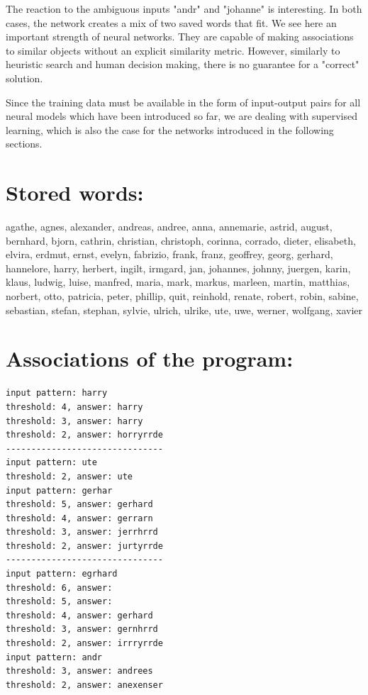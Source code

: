\documentclass[10pt]{book}
\begin{document}
\begin{center}
\begin{enumerate}
\begin{center}
\begin{center}
\begin{center}
The reaction to the ambiguous inputs "andr" and "johanne" is interesting. In both cases, the network creates a mix of two saved words that fit. We see here an important strength of neural networks. They are capable of making associations to similar objects without an explicit similarity metric. However, similarly to heuristic search and human decision making, there is no guarantee for a "correct" solution.

Since the training data must be available in the form of input-output pairs for all neural models which have been introduced so far, we are dealing with supervised learning, which is also the case for the networks introduced in the following sections.

\section*{Stored words:}
agathe, agnes, alexander, andreas, andree, anna, annemarie, astrid, august, bernhard, bjorn, cathrin, christian, christoph, corinna, corrado, dieter, elisabeth, elvira, erdmut, ernst, evelyn, fabrizio, frank, franz, geoffrey, georg, gerhard, hannelore, harry, herbert, ingilt, irmgard, jan, johannes, johnny, juergen, karin, klaus, ludwig, luise, manfred, maria, mark, markus, marleen, martin, matthias, norbert, otto, patricia, peter, phillip, quit, reinhold, renate, robert, robin, sabine, sebastian, stefan, stephan, sylvie, ulrich, ulrike, ute, uwe, werner, wolfgang, xavier


\section*{Associations of the program:}
\begin{verbatim}
input pattern: harry
threshold: 4, answer: harry
threshold: 3, answer: harry
threshold: 2, answer: horryrrde
-------------------------------
input pattern: ute
threshold: 2, answer: ute
input pattern: gerhar
threshold: 5, answer: gerhard
threshold: 4, answer: gerrarn
threshold: 3, answer: jerrhrrd
threshold: 2, answer: jurtyrrde
-------------------------------
input pattern: egrhard
threshold: 6, answer:
threshold: 5, answer:
threshold: 4, answer: gerhard
threshold: 3, answer: gernhrrd
threshold: 2, answer: irrryrrde
input pattern: andr
threshold: 3, answer: andrees
threshold: 2, answer: anexenser
\end{verbatim}


\end{center}
\end{center}
\end{center}
\end{enumerate}
\end{center}
\end{document}
